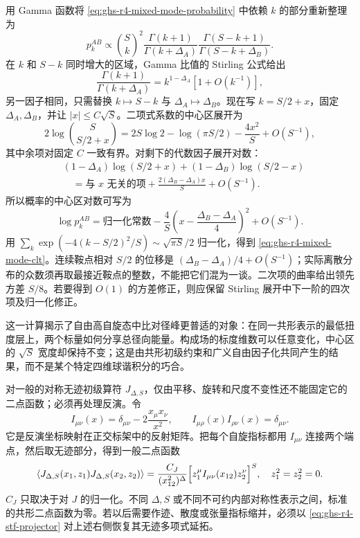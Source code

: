用 Gamma 函数将 \cref{eq:ghs-r4-mixed-mode-probability} 中依赖 $k$ 的部分重新整理为
\begin{equation*}
 p_k^{AB}\propto\binom Sk^2
 \frac{\Gamma(k+1)}{\Gamma(k+\Delta_A)}
 \frac{\Gamma(S-k+1)}{\Gamma(S-k+\Delta_B)}.
\end{equation*}
在 $k$ 和 $S-k$ 同时增大的区域，Gamma 比值的 Stirling 公式给出
\begin{equation*}
 \frac{\Gamma(k+1)}{\Gamma(k+\Delta_A)}
 =k^{1-\Delta_A}[1+O(k^{-1})],
\end{equation*}
另一因子相同，只需替换 $k\mapsto S-k$ 与 $\Delta_A\mapsto\Delta_B$。现在写 $k=S/2+x$，固定 $\Delta_A,\Delta_B$，并让 $|x|\le C\sqrt S$。二项式系数的中心区展开为
\begin{equation*}
 2\log\binom S{S/2+x}
 =2S\log2-\log(\pi S/2)-\frac{4x^2}{S}
 +O(S^{-1}),
\end{equation*}
其中余项对固定 $C$ 一致有界。对剩下的代数因子展开对数：
\begin{align*}
 &(1-\Delta_A)\log(S/2+x)
 +(1-\Delta_B)\log(S/2-x)\\
 &\quad=\text{与 $x$ 无关的项}
 +\frac{2(\Delta_B-\Delta_A)x}{S}+O(S^{-1}).
\end{align*}
所以概率的中心区对数可写为
\begin{equation*}
 \log p_k^{AB}=\text{归一化常数}
 -\frac4S\left(x-\frac{\Delta_B-\Delta_A}{4}\right)^2
 +O(S^{-1}).
\end{equation*}
用 \(\sum_k\exp(-4(k-S/2)^2/S)\sim\sqrt{\pi S}/2\) 归一化，得到 \cref{eq:ghs-r4-mixed-mode-clt}。连续鞍点相对 $S/2$ 的位移是 $(\Delta_B-\Delta_A)/4+O(S^{-1})$；实际离散分布的众数须再取最接近鞍点的整数，不能把它们混为一谈。二次项的曲率给出领先方差 $S/8$。若要得到 $O(1)$ 的方差修正，则应保留 Stirling 展开中下一阶的四次项及归一化修正。


这一计算揭示了自由高自旋态中比对径峰更普适的对象：在同一共形表示的最低扭度层上，两个标量如何分享总径向能量。构成场的标度维数可以任意变化，中心区的 $\sqrt S$ 宽度却保持不变；这是由共形初级约束和广义自由因子化共同产生的结果，而不是某个特定四维球谐积分的巧合。




对一般的对称无迹初级算符 $J_{\Delta,S}$，仅由平移、旋转和尺度不变性还不能固定它的二点函数；必须再处理反演。令
\begin{equation}\label{eq:ghs-r4-inversion-matrix}
 I_{\mu\nu}(x)=\delta_{\mu\nu}-2\frac{x_\mu x_\nu}{x^2},\qquad
 I_{\mu\rho}(x)I_{\rho\nu}(x)=\delta_{\mu\nu}.
\end{equation}
它是反演坐标映射在正交标架中的反射矩阵。把每个自旋指标都用 $I_{\mu\nu}$ 连接两个端点，然后取无迹部分，得到一般二点函数
\begin{equation}\label{eq:ghs-r4-general-stt-two-point}
 \langle J_{\Delta,S}(x_1,z_1)J_{\Delta,S}(x_2,z_2)\rangle
 =\frac{C_J}{(x_{12}^2)^\Delta}
 \Bigl[z_1^\mu I_{\mu\nu}(x_{12})z_2^\nu\Bigr]^S,
 \quad z_1^2=z_2^2=0.
\end{equation}
$C_J$ 只取决于对 $J$ 的归一化。不同 $\Delta,S$ 或不同不可约内部对称性表示之间，标准的共形二点函数为零。若以后需要作迹、散度或张量指标缩并，必须以 \cref{eq:ghs-r4-stf-projector} 对上述右侧恢复其无迹多项式延拓。


